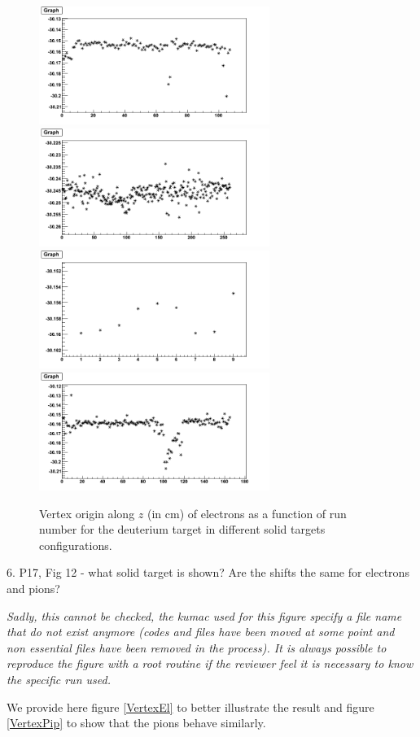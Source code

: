 \documentclass[12pt]{article}
\begin{document}
\begin{figure}[tbp]
\centering
\includegraphics[width=7.5cm] {answer-fig/VertexDeutC.png} 
\includegraphics[width=7.5cm] {answer-fig/VertexDeutFe.png} 
\includegraphics[width=7.5cm] {answer-fig/VertexDeutSn.png} 
\includegraphics[width=7.5cm] {answer-fig/VertexDeutPb.png} 
\caption {Vertex origin along $z$ (in cm) of electrons as a function of run 
number for the deuterium target in different solid targets configurations.}
\label{VertexLiquid}
\end{figure}

6.
P17, Fig 12 - what solid target is shown?  Are the shifts the same for electrons and pions?

{\it Sadly, this cannot be checked, the kumac used for this figure specify a file name that
do not exist anymore (codes and files have been moved at some point and non essential files
have been removed in the process). It is always possible to reproduce the figure with a root 
routine if the reviewer feel it is necessary to know the specific run used. 

We provide here figure \ref{VertexEl} to better illustrate the result and figure 
\ref{VertexPip} to show that the pions behave similarly.}\\
\end{document}
